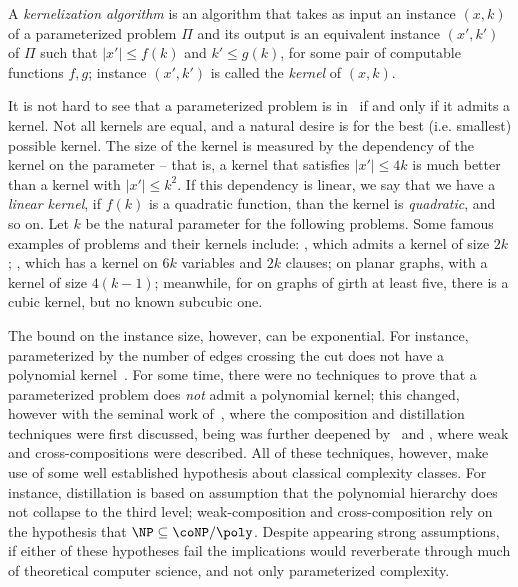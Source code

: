 \begin{class_definition*}[Kernelization]
    A  \textit{kernelization algorithm} is an algorithm that takes as input an instance $(x,k)$ of a parameterized problem $\Pi$ and its output is an equivalent instance $(x',k')$ of $\Pi$ such that $|x'| \leq f(k)$ and $k' \leq g(k)$, for some pair of computable functions $f,g$; instance $(x',k')$ is called the \textit{kernel} of $(x,k)$.
\end{class_definition*}

It is not hard to see that a parameterized problem is in \FPT\ if and only if it admits a kernel.
Not all kernels are equal, and a natural desire is for the best (i.e. smallest) possible kernel.
The size of the kernel is measured by the dependency of the kernel on the parameter -- that is, a kernel that satisfies $|x'| \leq 4k$ is much better than a kernel with $|x'| \leq k^2$.
If this dependency is linear, we say that we have a \textit{linear kernel}, if $f(k)$ is a quadratic function, than the kernel is \textit{quadratic}, and so on.
Let $k$ be the natural parameter for the following problems.
Some famous examples of problems and their kernels include: , which admits a kernel of size $2k$; , which has a kernel on $6k$ variables and $2k$ clauses;  on planar graphs, with a kernel of size $4(k - 1)$;
meanwhile, for  on graphs of girth at least five, there is a cubic kernel, but no known subcubic one.

The bound on the instance size, however, can be exponential.
For instance,  parameterized by the number of edges crossing the cut does not have a polynomial kernel~\citep{matching_cut_ipec}.
For some time, there were no techniques to prove that a parameterized problem does \textit{not} admit a polynomial kernel; this changed, however with the seminal work of~\cite{BodlaenderDFH09}, where the composition and distillation techniques were first discussed, being was further deepened
by~\cite{weak_composition} and \cite{BodlaenderJK14}, where weak and cross-compositions were described.
All of these techniques, however, make use of some well established hypothesis about classical complexity classes.
For instance, distillation is based on assumption that the polynomial hierarchy does not collapse to the third level; weak-composition and cross-composition rely on the hypothesis that $\NP \subseteq \coNP/\poly$.
Despite appearing strong assumptions, if either of these hypotheses fail the implications would reverberate through much of theoretical computer science, and not only parameterized complexity.

